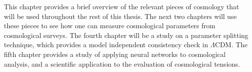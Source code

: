 This chapter provides a brief overview of the relevant pieces of cosmology that will be used throughout the rest of this thesis. The next two chapters will use these pieces to see how one can measure cosmological parameters from cosmological surveys. The fourth chapter will be a study on a parameter splitting technique, which provides a model independent consistency check in $\Lambda$CDM. The fifth chapter provides a study of applying neural networks to cosmological analysis, and a scientific application to the evaluation of cosmological tensions.
